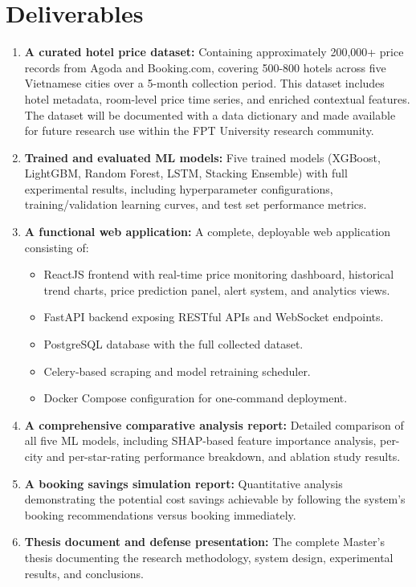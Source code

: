 \documentclass[12pt,a4paper]{report}
\begin{document}
\section{Deliverables}

\begin{enumerate}
    \item \textbf{A curated hotel price dataset:} Containing approximately 200,000+ price records from Agoda and Booking.com, covering 500-800 hotels across five Vietnamese cities over a 5-month collection period. This dataset includes hotel metadata, room-level price time series, and enriched contextual features. The dataset will be documented with a data dictionary and made available for future research use within the FPT University research community.
    
    \item \textbf{Trained and evaluated ML models:} Five trained models (XGBoost, LightGBM, Random Forest, LSTM, Stacking Ensemble) with full experimental results, including hyperparameter configurations, training/validation learning curves, and test set performance metrics.
    
    \item \textbf{A functional web application:} A complete, deployable web application consisting of:
    \begin{itemize}
        \item ReactJS frontend with real-time price monitoring dashboard, historical trend charts, price prediction panel, alert system, and analytics views.
        \item FastAPI backend exposing RESTful APIs and WebSocket endpoints.
        \item PostgreSQL database with the full collected dataset.
        \item Celery-based scraping and model retraining scheduler.
        \item Docker Compose configuration for one-command deployment.
    \end{itemize}
    
    \item \textbf{A comprehensive comparative analysis report:} Detailed comparison of all five ML models, including SHAP-based feature importance analysis, per-city and per-star-rating performance breakdown, and ablation study results.
    
    \item \textbf{A booking savings simulation report:} Quantitative analysis demonstrating the potential cost savings achievable by following the system's booking recommendations versus booking immediately.
    
    \item \textbf{Thesis document and defense presentation:} The complete Master's thesis documenting the research methodology, system design, experimental results, and conclusions.
\end{enumerate}
\end{document}
